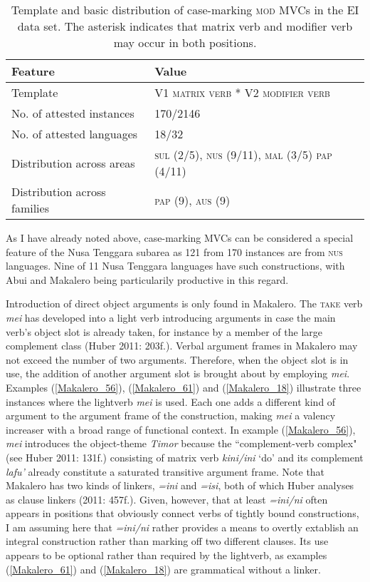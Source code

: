 \begin{table}


\begin{tabular}{ll}
\lsptoprule
Feature&Value\tabularnewline
\hline
Template&V1 \textsc{matrix verb} * V2 \textsc{modifier verb}\tabularnewline
No. of attested instances& 170/2146 \tabularnewline
No. of attested languages& 18/32 \tabularnewline
Distribution across areas& \textsc{sul} (2/5), \textsc{nus} (9/11), \textsc{mal} (3/5) \textsc{pap} (4/11) \tabularnewline
Distribution across families& \textsc{pap} (9), \textsc{aus} (9) \tabularnewline
\hline
\end{tabular}
\caption[Template and basic distribution of case-marking \textsc{mod} MVCs]{Template and basic distribution of case-marking \textsc{mod} MVCs in the EI data set. The asterisk indicates that matrix verb and modifier verb may occur in both positions.}
\label{table:case}
\end{table}


As I have already noted above, case-marking MVCs can be considered a special feature of the Nusa Tenggara subarea as 121 from 170 instances are from \textsc{nus} languages. Nine of 11 Nusa Tenggara languages have such constructions, with Abui and Makalero being particularily productive in this regard.

Introduction of direct object arguments is only found in Makalero. The \textsc{take} verb \textit{mei} has developed into a light verb introducing arguments in case the main verb's object slot is already taken, for instance by a member of the large complement class (Huber 2011: 203f.). Verbal argument frames in Makalero may not exceed the number of two arguments. Therefore, when the object slot is in use, the addition of another argument slot is brought about by employing \textit{mei}. Examples (\ref{Makalero_56}), (\ref{Makalero_61}) and (\ref{Makalero_18}) illustrate three instances where the lightverb \textit{mei} is used. Each one adds a different kind of argument to the argument frame of the construction, making \textit{mei} a valency increaser with a broad range of functional context. In example (\ref{Makalero_56}), \textit{mei} introduces the object-theme \textit{Timor} because the ``complement-verb complex" (see Huber 2011: 131f.) consisting of matrix verb \textit{kini/ini} `do' and its complement \textit{lafu'} already constitute a saturated transitive argument frame. Note that Makalero has two kinds of linkers, \textit{=ini} and \textit{=isi}, both of which Huber analyses as clause linkers (2011: 457f.). Given, however, that at least \textit{=ini/ni} often appears in positions that obviously connect verbs of tightly bound constructions, I am assuming here that \textit{=ini/ni} rather provides a means to overtly extablish an integral construction rather than marking off two different clauses. Its use appears to be optional rather than required by the lightverb, as examples (\ref{Makalero_61}) and (\ref{Makalero_18}) are grammatical without a linker.

